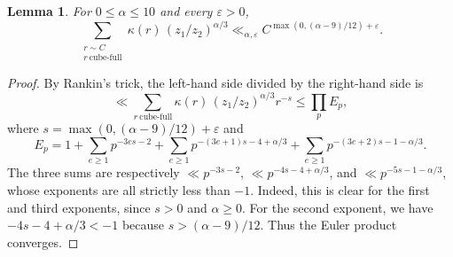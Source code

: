 \documentclass[a4paper,11pt, twoside,reqno]{amsart}
\theoremstyle{plain}
\newtheorem{lemma}[thm]{Lemma}
\theoremstyle{definition}
\theoremstyle{remark}
\renewcommand{\le}{\leqslant}
\renewcommand{\ge}{\geqslant}
\numberwithin{equation}{section}
\begin{document}
\begin{lemma}\label{lem:n10-cubefull-weights}
For $0\le\alpha\le10$ and every $\varepsilon>0$,
\[
\sum_{\substack{r\sim C\\r\ \mathrm{cube\text{-}full}}}
\kappa(r)\, (z_1/z_2)^{\alpha/3}
\ll_{\alpha,\varepsilon}
C^{\max(0,(\alpha-9)/12)+\varepsilon}.
\]
\end{lemma}

\begin{proof}
By Rankin's trick, the left-hand side divided by the right-hand side is
\begin{equation*}
\ll \sum_{r\ \mathrm{cube\text{-}full}}
\kappa(r)\, (z_1/z_2)^{\alpha/3} r^{-s}
\le \prod_p E_p,
\end{equation*}
where $s=\max(0,(\alpha-9)/12)+\varepsilon$ and
\[
E_p = 1+\sum_{e\ge1}p^{-3es-2}
+\sum_{e\ge1}p^{-(3e+1)s-4+\alpha/3}
+\sum_{e\ge1}p^{-(3e+2)s-1-\alpha/3}.
\]
The three sums are respectively
$\ll p^{-3s-2}$,
$\ll p^{-4s-4+\alpha/3}$,
and $\ll p^{-5s-1-\alpha/3}$,
whose exponents are all strictly less than $-1$.
Indeed, this is clear for the first and third exponents,
since $s>0$ and $\alpha\ge 0$.
For the second exponent, we have $-4s-4+\alpha/3 < -1$
because $s > (\alpha-9)/12$.
Thus the Euler product converges.
\end{proof}
\end{document}
